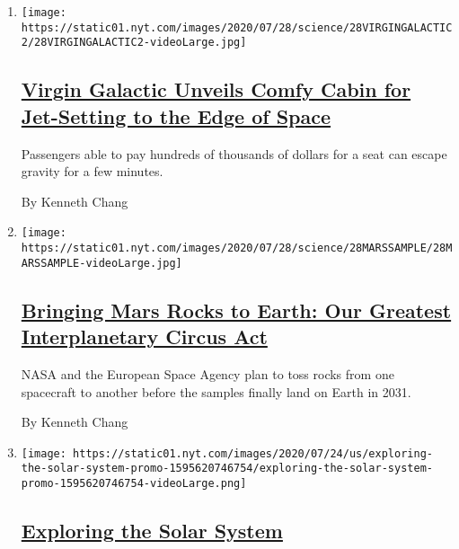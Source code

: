 \begin{enumerate}
\def\labelenumi{\arabic{enumi}.}
\item
  \texttt{[image: https://static01.nyt.com/images/2020/07/28/science/28VIRGINGALACTIC2/28VIRGINGALACTIC2-videoLarge.jpg]}

  \hypertarget{virgin-galactic-unveils-comfy-cabin-for-jet-setting-to-the-edge-of-space}{%
  \subsection{\texorpdfstring{\href{/2020/07/28/science/virgin-galactic-cabin.html}{Virgin
  Galactic Unveils Comfy Cabin for Jet-Setting to the Edge of
  Space}}{Virgin Galactic Unveils Comfy Cabin for Jet-Setting to the Edge of Space}}\label{virgin-galactic-unveils-comfy-cabin-for-jet-setting-to-the-edge-of-space}}

  Passengers able to pay hundreds of thousands of dollars for a seat can
  escape gravity for a few minutes.

  By Kenneth Chang
\item
  \texttt{[image: https://static01.nyt.com/images/2020/07/28/science/28MARSSAMPLE/28MARSSAMPLE-videoLarge.jpg]}

  \hypertarget{bringing-mars-rocks-to-earth-our-greatest-interplanetary-circus-act}{%
  \subsection{\texorpdfstring{\href{/2020/07/28/science/mars-sample-return-mission.html}{Bringing
  Mars Rocks to Earth: Our Greatest Interplanetary Circus
  Act}}{Bringing Mars Rocks to Earth: Our Greatest Interplanetary Circus Act}}\label{bringing-mars-rocks-to-earth-our-greatest-interplanetary-circus-act}}

  NASA and the European Space Agency plan to toss rocks from one
  spacecraft to another before the samples finally land on Earth in
  2031.

  By Kenneth Chang
\item
  \texttt{[image: https://static01.nyt.com/images/2020/07/24/us/exploring-the-solar-system-promo-1595620746754/exploring-the-solar-system-promo-1595620746754-videoLarge.png]}

  \hypertarget{exploring-the-solar-system}{%
  \subsection{\texorpdfstring{\href{/interactive/2020/science/exploring-the-solar-system.html}{Exploring
  the Solar
  System}}{Exploring the Solar System}}\label{exploring-the-solar-system}}


\end{enumerate}
